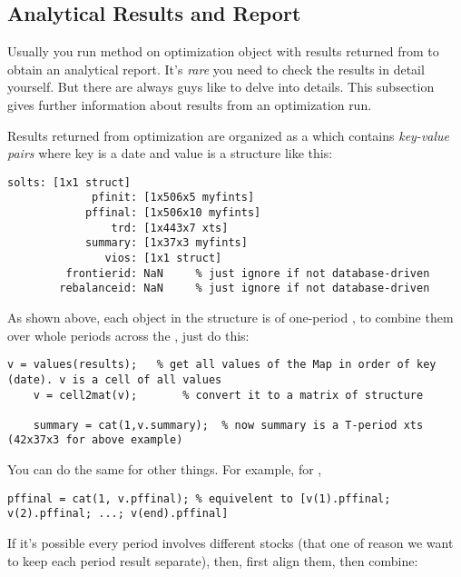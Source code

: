 \subsection{Analytical Results and Report}

Usually you run  method on optimization object with results returned from
 to obtain an analytical report.
It's \emph{rare} you need to check the results in detail yourself.
But there are always guys like to delve into details.
This subsection gives further information about results from an optimization run.

Results returned from optimization  are organized as a 
which contains \emph{key-value pairs} where key is a date and value is a structure like this:

\begin{lstlisting}[numbers=none]     
	          solts: [1x1 struct]
	         pfinit: [1x506x5 myfints]
	        pffinal: [1x506x10 myfints]
	            trd: [1x443x7 xts]
	        summary: [1x37x3 myfints]
	           vios: [1x1 struct]
	     frontierid: NaN     % just ignore if not database-driven
	    rebalanceid: NaN     % just ignore if not database-driven
\end{lstlisting}

As shown above, each  object in the structure is of one-period , 
to combine them over whole periods across the , just do this:

\begin{lstlisting}[numbers=none]  
    v = values(results);   % get all values of the Map in order of key (date). v is a cell of all values
    v = cell2mat(v);       % convert it to a matrix of structure
 
    summary = cat(1,v.summary);  % now summary is a T-period xts (42x37x3 for above example)
\end{lstlisting}

You can do the same for other  things. For example, for ,

\begin{lstlisting}[numbers=none]  
    pffinal = cat(1, v.pffinal); % equivelent to [v(1).pffinal; v(2).pffinal; ...; v(end).pffinal]
\end{lstlisting}
 
If it's possible every period involves different stocks (that one of reason we want to keep each period result separate),
then, first align them, then combine:
 
